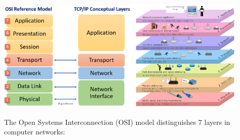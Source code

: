 \includegraphics[width=0.5\textwidth,height=0.3\textheight]{notes/../figures/osi-model-2.png} \includegraphics[width=0.4\textwidth,height=0.3\textheight]{notes/../figures/osi-model-1.png}

The Open Systems Interconnection (OSI) model distinguishes 7 layers in computer networks:

